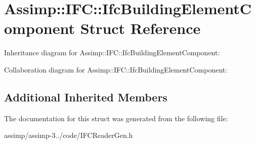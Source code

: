 \hypertarget{struct_assimp_1_1_i_f_c_1_1_ifc_building_element_component}{\section{Assimp\+:\+:I\+F\+C\+:\+:Ifc\+Building\+Element\+Component Struct Reference}
\label{struct_assimp_1_1_i_f_c_1_1_ifc_building_element_component}
}


Inheritance diagram for Assimp\+:\+:I\+F\+C\+:\+:Ifc\+Building\+Element\+Component\+:


Collaboration diagram for Assimp\+:\+:I\+F\+C\+:\+:Ifc\+Building\+Element\+Component\+:
\subsection*{Additional Inherited Members}


The documentation for this struct was generated from the following file\+:\begin{DoxyCompactItemize}
\item 
assimp/assimp-\/3../code/I\+F\+C\+Reader\+Gen.\+h\end{DoxyCompactItemize}

